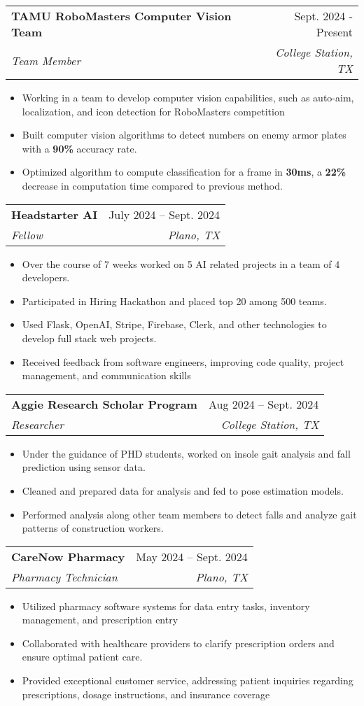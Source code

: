 \documentclass[letterpaper,11pt]{article}
\makeatletter
\newcommand{\resumeItem}[1]{
  \item\small{
    {#1 \vspace{-2pt}}
  }
}
\newcommand{\resumeSubheading}[4]{
  \vspace{-2pt}\item
    \begin{tabular*}{0.97\textwidth}[t]{l@{\extracolsep{\fill}}r}
      \textbf{#1} & #2 \\
      \textit{\small#3} & \textit{\small #4} \\
    \end{tabular*}\vspace{-7pt}
}
\newcommand{\resumeSubSubheading}[2]{
    \item
    \begin{tabular*}{0.97\textwidth}{l@{\extracolsep{\fill}}r}
      \textit{\small#1} & \textit{\small #2} \\
    \end{tabular*}\vspace{-7pt}
}
\newcommand{\resumeSubHeadingListEnd}{\end{itemize}}
\newcommand{\resumeItemListStart}{\begin{itemize}}
\newcommand{\resumeItemListEnd}{\end{itemize}\vspace{-5pt}}
\makeatother
\begin{document}
  \resumeSubheading
      {TAMU RoboMasters Computer Vision Team}{Sept. 2024 - Present}
      {Team Member}{College Station, TX}
      \resumeItemListStart
        \resumeItem{Working in a team to develop computer vision capabilities, such as auto-aim, localization, and icon detection for RoboMasters competition}
        \resumeItem{Built computer vision algorithms to detect numbers on enemy armor plates with a \textbf{90\%} accuracy rate.}
        \resumeItem{Optimized algorithm to compute classification for a frame in \textbf{30ms}, a \textbf{22\%} decrease in computation time compared to previous method.}
      \resumeItemListEnd

    \resumeSubheading
      {Headstarter AI}{July 2024 -- Sept. 2024}
      {Fellow}{Plano, TX}
      \resumeItemListStart
        \resumeItem{Over the course of 7 weeks worked on 5 AI related projects in a team of 4 developers.}
        \resumeItem{Participated in Hiring Hackathon and placed top 20 among 500 teams.}
        \resumeItem{Used Flask, OpenAI, Stripe, Firebase, Clerk, and other technologies to develop full stack web projects.}
        \resumeItem{Received feedback from software engineers, improving code quality, project management, and communication skills}
      \resumeItemListEnd


      \resumeSubheading
      {Aggie Research Scholar Program}{Aug 2024 -- Sept. 2024}
      {Researcher}{College Station, TX}
      \resumeItemListStart
        \resumeItem{Under the guidance of PHD students, worked on insole gait analysis and fall prediction using sensor data.}
        \resumeItem{Cleaned and prepared data for analysis and fed to pose estimation models.}
        \resumeItem{Performed analysis along other team members to detect falls and analyze gait patterns of construction workers.}
      \resumeItemListEnd

      \resumeSubheading
      {CareNow Pharmacy}{May 2024 -- Sept. 2024}
      {Pharmacy Technician}{Plano, TX}
      \resumeItemListStart
        \resumeItem{Utilized pharmacy software systems for data entry tasks, inventory management, and prescription entry}
        \resumeItem{Collaborated with healthcare providers to clarify prescription orders and ensure optimal patient care.}
        \resumeItem{Provided exceptional customer service, addressing patient inquiries regarding prescriptions, dosage instructions, and insurance coverage}
      \resumeItemListEnd
      
\end{document}
